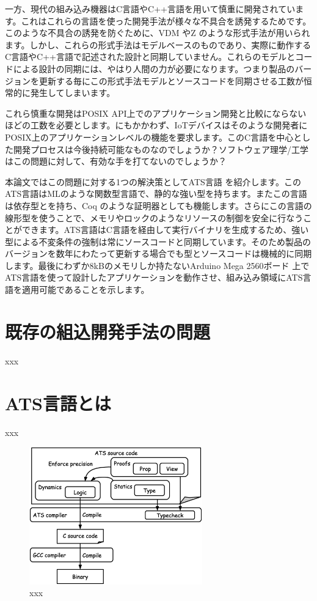 \documentclass{ipsjprosym}
\begin{document}
一方、現代の組み込み機器はC言語やC++言語を用いて慎重に開発されています。これはこれらの言語を使った開発手法が様々な不具合を誘発するためです。このような不具合の誘発を防ぐために、VDM \cite{vdm} やZ \cite{z_notation} のような形式手法が用いられます。しかし、これらの形式手法はモデルベースのものであり、実際に動作するC言語やC++言語で記述された設計と同期していません。これらのモデルとコードによる設計の同期には、やはり人間の力が必要になります。つまり製品のバージョンを更新する毎にこの形式手法モデルとソースコードを同期させる工数が恒常的に発生してしまいます。

これら慎重な開発はPOSIX API上でのアプリケーション開発と比較にならないほどの工数を必要とします。にもかかわず、IoTデバイスはそのような開発者にPOSIX上のアプリケーションレベルの機能を要求します。このC言語を中心とした開発プロセスは今後持続可能なものなのでしょうか？ソフトウェア理学/工学はこの問題に対して、有効な手を打てないのでしょうか？

本論文ではこの問題に対する1つの解決策としてATS言語 \cite{ats} を紹介します。このATS言語はMLのような関数型言語で、静的な強い型を持ちます。またこの言語は依存型とを持ち、Coq \cite{Coq_manual} のような証明器としても機能します。さらにこの言語の線形型を使うことで、メモリやロックのようなリソースの制御を安全に行なうことができます。ATS言語はC言語を経由して実行バイナリを生成するため、強い型による不変条件の強制は常にソースコードと同期しています。そのため製品のバージョンを数年にわたって更新する場合でも型とソースコードは機械的に同期します。最後にわずか8kBのメモリしか持たないArduino Mega 2560ボード \cite{arduino-mega} 上でATS言語を使って設計したアプリケーションを動作させ、組み込み領域にATS言語を適用可能であることを示します。

\section{既存の組込開発手法の問題}

xxx

\section{ATS言語とは}

xxx

\begin{figure}[h]
\centering
\includegraphics[width=75mm]{draw/flow.eps}
\caption{xxx}
\label{fig:flow}
\end{figure}
\end{document}
